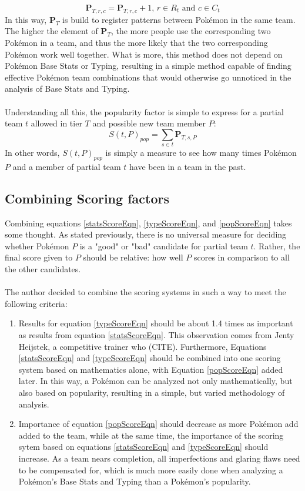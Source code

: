 \documentclass{article}
\begin{document}
\begin{equation*}
	\textbf{P}_{T,r,c}=\textbf{P}_{T,r,c}+1\text{, }r\in R_t\text{ and }c\in C_t
\end{equation*}
In this way, $\textbf{P}_T$ is build to register patterns between Pok\'emon in the same team. The higher the element of $\textbf{P}_T$, the more people use the corresponding two Pok\'emon in a team, and thus the more likely that the two corresponding Pok\'emon work well together. What is more, this method does not depend on Pok\'emon Base Stats or Typing, resulting in a simple method capable of finding effective Pok\'emon team combinations that would otherwise go unnoticed in the analysis of Base Stats and Typing.\\\\
Understanding all this, the popularity factor is simple to express for a partial team $t$ allowed in tier $T$ and possible new team member $P$:
\begin{equation}\label{popScoreEqn}
	S(t,P)_{pop}=\sum_{s\in t}\textbf{P}_{T,s,P}
\end{equation}
In other words, $S(t,P)_{pop}$ is simply a measure to see how many times Pok\'emon $P$ and a member of partial team $t$ have been in a team in the past.

\subsection{Combining Scoring factors}
Combining equations \ref{statsScoreEqn}, \ref{typeScoreEqn}, and \ref{popScoreEqn} takes some thought. As stated previously, there is no universal measure for deciding whether Pok\'emon $P$ is a "good" or "bad" candidate for partial team $t$. Rather, the final score given to $P$ should be relative: how well $P$ scores in comparison to all the other candidates.\\\\
The author decided to combine the scoring systems in such a way to meet the following criteria:
\begin{enumerate}
	\item Results for equation \ref{typeScoreEqn} should be about 1.4 times as important as results from equation \ref{statsScoreEqn}. This observation comes from Jenty Heijstek, a competitive trainer who (CITE). Furthermore, Equations \ref{statsScoreEqn} and \ref{typeScoreEqn} should be combined into one scoring system based on mathematics alone, with Equation \ref{popScoreEqn} added later. In this way, a Pok\'emon can be analyzed not only mathematically, but also based on popularity, resulting in a simple, but varied methodology of analysis.
	\item Importance of equation \ref{popScoreEqn} should decrease as more Pok\'emon add added to the team, while at the same time, the importance of the scoring sytem based on equations \ref{statsScoreEqn} and \ref{typeScoreEqn} should increase. As a team nears completion, all imperfections and glaring flaws need to be compensated for, which is much more easily done when analyzing a Pok\'emon's Base Stats and Typing than a Pok\'emon's popularity. 
\end{enumerate}
\end{document}
